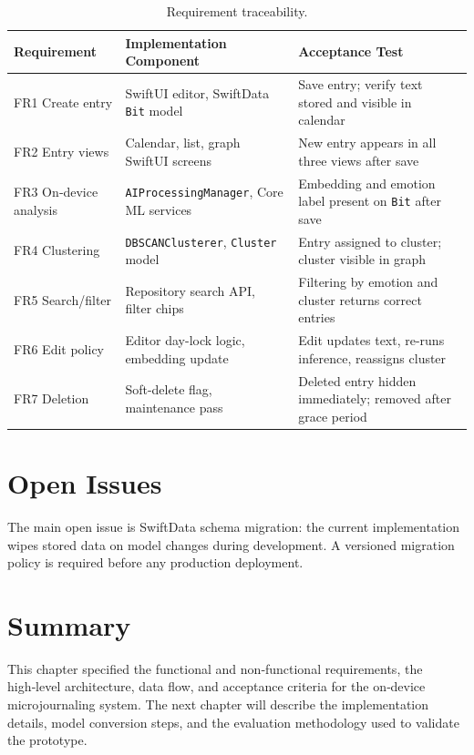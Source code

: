 \begin{table}[h!]
\centering
\caption{Requirement traceability.}
\label{tab:traceability}
\begin{tabular}{p{} p{} p{}}
\hline
\textbf{Requirement} & \textbf{Implementation Component} & \textbf{Acceptance Test} \\
\hline
FR1 Create entry      & SwiftUI editor, SwiftData \texttt{Bit} model          & Save entry; verify text stored and visible in calendar \\
FR2 Entry views       & Calendar, list, graph SwiftUI screens                  & New entry appears in all three views after save \\
FR3 On‑device analysis & \texttt{AIProcessingManager}, Core ML services         & Embedding and emotion label present on \texttt{Bit} after save \\
FR4 Clustering        & \texttt{DBSCANClusterer}, \texttt{Cluster} model        & Entry assigned to cluster; cluster visible in graph \\
FR5 Search/filter     & Repository search API, filter chips                    & Filtering by emotion and cluster returns correct entries \\
FR6 Edit policy       & Editor day-lock logic, embedding update                & Edit updates text, re-runs inference, reassigns cluster \\
FR7 Deletion          & Soft-delete flag, maintenance pass                     & Deleted entry hidden immediately; removed after grace period \\
\hline
\end{tabular}
\end{table}

\section{Open Issues}
The main open issue is SwiftData schema migration: the current implementation wipes stored data on model changes during development. A versioned migration policy is required before any production deployment.

\section{Summary}
This chapter specified the functional and non‑functional requirements, the high‑level architecture, data flow, and acceptance criteria for the on‑device microjournaling system. The next chapter will describe the implementation details, model conversion steps, and the evaluation methodology used to validate the prototype.
